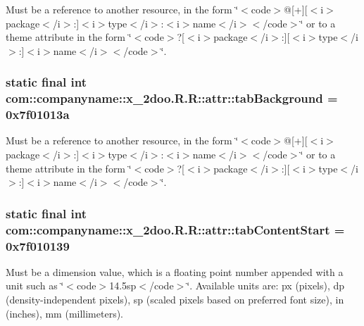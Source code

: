 Must be a reference to another resource, in the form \char`\"{}$<$code$>$@\mbox{[}+\mbox{]}\mbox{[}$<$i$>$package$<$/i$>$:\mbox{]}$<$i$>$type$<$/i$>$:$<$i$>$name$<$/i$>$$<$/code$>$\char`\"{} or to a theme attribute in the form \char`\"{}$<$code$>$?\mbox{[}$<$i$>$package$<$/i$>$:\mbox{]}\mbox{[}$<$i$>$type$<$/i$>$:\mbox{]}$<$i$>$name$<$/i$>$$<$/code$>$\char`\"{}. \hypertarget{classcom_1_1companyname_1_1x__2doo_1_1_r_1_1attr_4946a58267e3e442f79aca572d995400}{
\subsubsection[{tabBackground}]{\setlength{\rightskip}{0pt plus 5cm}static final int com::companyname::x\_\-2doo.R.R::attr::tabBackground = 0x7f01013a}}
\label{classcom_1_1companyname_1_1x__2doo_1_1_r_1_1attr_4946a58267e3e442f79aca572d995400}


Must be a reference to another resource, in the form \char`\"{}$<$code$>$@\mbox{[}+\mbox{]}\mbox{[}$<$i$>$package$<$/i$>$:\mbox{]}$<$i$>$type$<$/i$>$:$<$i$>$name$<$/i$>$$<$/code$>$\char`\"{} or to a theme attribute in the form \char`\"{}$<$code$>$?\mbox{[}$<$i$>$package$<$/i$>$:\mbox{]}\mbox{[}$<$i$>$type$<$/i$>$:\mbox{]}$<$i$>$name$<$/i$>$$<$/code$>$\char`\"{}. \hypertarget{classcom_1_1companyname_1_1x__2doo_1_1_r_1_1attr_f4d0aa05b8d10131f3b057e790e28642}{
\subsubsection[{tabContentStart}]{\setlength{\rightskip}{0pt plus 5cm}static final int com::companyname::x\_\-2doo.R.R::attr::tabContentStart = 0x7f010139}}
\label{classcom_1_1companyname_1_1x__2doo_1_1_r_1_1attr_f4d0aa05b8d10131f3b057e790e28642}


Must be a dimension value, which is a floating point number appended with a unit such as \char`\"{}$<$code$>$14.5sp$<$/code$>$\char`\"{}. Available units are: px (pixels), dp (density-independent pixels), sp (scaled pixels based on preferred font size), in (inches), mm (millimeters). 

